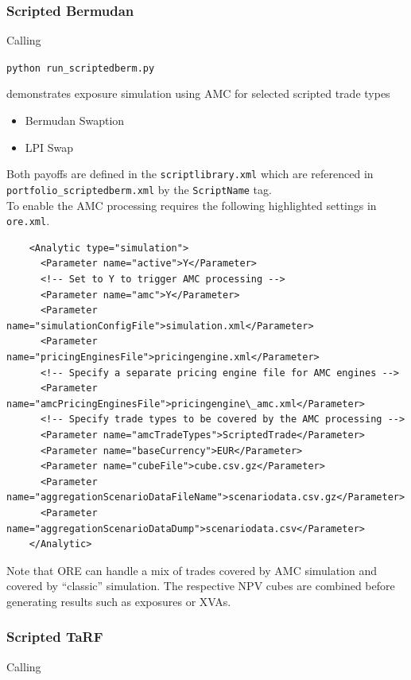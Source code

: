 \subsubsection{Scripted Bermudan}

Calling 

\medskip
\centerline {\tt python run\_scriptedberm.py} 

\medskip
demonstrates exposure simulation using AMC for selected scripted trade types
\begin{itemize}
\item Bermudan Swaption
\item LPI Swap
\end{itemize}
Both payoffs are defined in the {\tt scriptlibrary.xml} which are referenced in {\tt portfolio\_scriptedberm.xml}
by the {\tt ScriptName} tag. \\

To enable the AMC processing requires the following highlighted settings in {\tt ore.xml}.

\begin{verbatim}
    <Analytic type="simulation">
      <Parameter name="active">Y</Parameter>
      <!-- Set to Y to trigger AMC processing -->
      <Parameter name="amc">Y</Parameter>
      <Parameter name="simulationConfigFile">simulation.xml</Parameter>
      <Parameter name="pricingEnginesFile">pricingengine.xml</Parameter>
      <!-- Specify a separate pricing engine file for AMC engines -->
      <Parameter name="amcPricingEnginesFile">pricingengine\_amc.xml</Parameter>
      <!-- Specify trade types to be covered by the AMC processing -->
      <Parameter name="amcTradeTypes">ScriptedTrade</Parameter>
      <Parameter name="baseCurrency">EUR</Parameter>
      <Parameter name="cubeFile">cube.csv.gz</Parameter>
      <Parameter name="aggregationScenarioDataFileName">scenariodata.csv.gz</Parameter>
      <Parameter name="aggregationScenarioDataDump">scenariodata.csv</Parameter>
    </Analytic>
\end{verbatim}

Note that ORE can handle a mix of trades covered by AMC simulation and covered by ``classic'' simulation.
The respective NPV cubes are combined before generating results such as exposures or XVAs.

\subsubsection{Scripted TaRF}

Calling 

